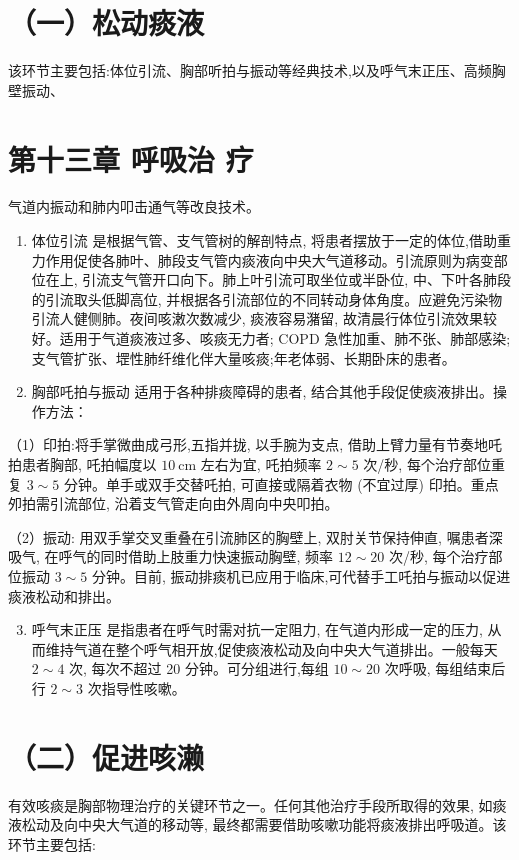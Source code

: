 \documentclass[10pt]{article}
\begin{document}
\section*{（一）松动痰液}
该环节主要包括:体位引流、胸部听拍与振动等经典技术,以及呼气末正压、高频胸壁振动、

\section*{第十三章 呼吸治 疗}
气道内振动和肺内叩击通气等改良技术。

\begin{enumerate}
  \item 体位引流 是根据气管、支气管树的解剖特点, 将患者摆放于一定的体位,借助重力作用促使各肺叶、肺段支气管内痰液向中央大气道移动。引流原则为病变部位在上, 引流支气管开口向下。肺上叶引流可取坐位或半卧位, 中、下叶各肺段的引流取头低脚高位, 并根据各引流部位的不同转动身体角度。应避免污染物引流人健侧肺。夜间咳潄次数减少, 痰液容易潴留, 故清晨行体位引流效果较好。适用于气道痰液过多、咳痰无力者; COPD 急性加重、肺不张、肺部感染;支气管扩张、堽性肺纤维化伴大量咳痰;年老体弱、长期卧床的患者。

  \item 胸部吒拍与振动 适用于各种排痰障碍的患者, 结合其他手段促使痰液排出。操作方法：

\end{enumerate}

（1）印拍:将手掌微曲成弓形,五指并拢, 以手腕为支点, 借助上臂力量有节奏地吒拍患者胸部, 吒拍幅度以 $10 \mathrm{~cm}$ 左右为宜, 吒拍频率 $2 \sim 5$ 次/秒, 每个治疗部位重复 $3 \sim 5$ 分钟。单手或双手交替吒拍, 可直接或隔着衣物 (不宜过厚) 印拍。重点夘拍需引流部位, 沿着支气管走向由外周向中央叩拍。

（2）振动: 用双手掌交叉重叠在引流肺区的胸壁上, 双肘关节保持伸直, 嘱患者深吸气, 在呼气的同时借助上肢重力快速振动胸壁, 频率 $12 \sim 20$ 次/秒, 每个治疗部位振动 $3 \sim 5$ 分钟。目前, 振动排痰机已应用于临床,可代替手工吒拍与振动以促进痰液松动和排出。

\begin{enumerate}
  \setcounter{enumi}{2}
  \item 呼气末正压 是指患者在呼气时需对抗一定阻力, 在气道内形成一定的压力, 从而维持气道在整个呼气相开放,促使痰液松动及向中央大气道排出。一般每天 $2 \sim 4$ 次, 每次不超过 20 分钟。可分组进行,每组 $10 \sim 20$ 次呼吸, 每组结束后行 $2 \sim 3$ 次指导性咳嗽。
\end{enumerate}

\section*{（二）促进咳濑}
有效咳痰是胸部物理治疗的关键环节之一。任何其他治疗手段所取得的效果, 如痰液松动及向中央大气道的移动等, 最终都需要借助咳嗽功能将痰液排出呼吸道。该环节主要包括:
\end{document}
